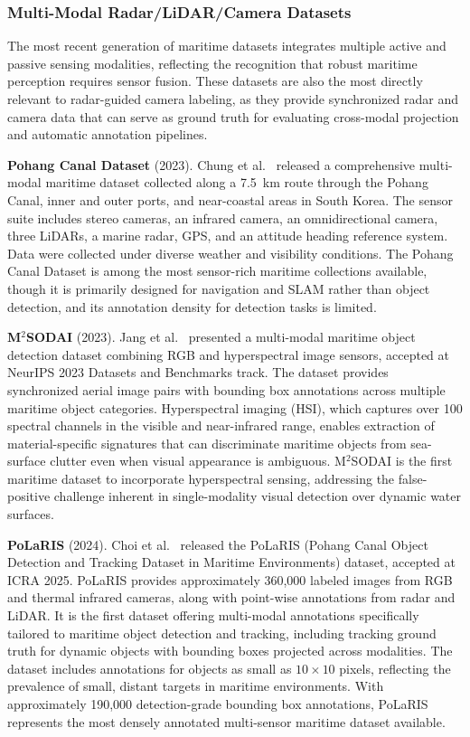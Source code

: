 \subsubsection{Multi-Modal Radar/LiDAR/Camera Datasets}
\label{subsubsec:multimodal}

The most recent generation of maritime datasets integrates multiple active and passive
sensing modalities, reflecting the recognition that robust maritime perception requires
sensor fusion. These datasets are also the most directly relevant to radar-guided camera
labeling, as they provide synchronized radar and camera data that can serve as ground
truth for evaluating cross-modal projection and automatic annotation pipelines.

\textbf{Pohang Canal Dataset} (2023). Chung et al.~\cite{Chung2023Pohang} released a
comprehensive multi-modal maritime dataset collected along a 7.5~km route through the
Pohang Canal, inner and outer ports, and near-coastal areas in South Korea. The sensor
suite includes stereo cameras, an infrared camera, an omnidirectional camera, three
LiDARs, a marine radar, GPS, and an attitude heading reference system. Data were collected
under diverse weather and visibility conditions. The Pohang Canal Dataset is among the
most sensor-rich maritime collections available, though it is primarily designed for
navigation and SLAM rather than object detection, and its annotation density for detection
tasks is limited.

\textbf{M$^2$SODAI} (2023). Jang et al.~\cite{Jang2023M2SODAI} presented a multi-modal
maritime object detection dataset combining RGB and hyperspectral image sensors, accepted
at NeurIPS 2023 Datasets and Benchmarks track. The dataset provides synchronized aerial
image pairs with bounding box annotations across multiple maritime object categories.
Hyperspectral imaging (HSI), which captures over 100 spectral channels in the visible
and near-infrared range, enables extraction of material-specific signatures that can
discriminate maritime objects from sea-surface clutter even when visual appearance is
ambiguous. M$^2$SODAI is the first maritime dataset to incorporate hyperspectral sensing,
addressing the false-positive challenge inherent in single-modality visual detection
over dynamic water surfaces.

\textbf{PoLaRIS} (2024). Choi et al.~\cite{Choi2024PoLaRIS} released the PoLaRIS
(Pohang Canal Object Detection and Tracking Dataset in Maritime Environments) dataset,
accepted at ICRA 2025. PoLaRIS provides approximately 360,000 labeled images from RGB
and thermal infrared cameras, along with point-wise annotations from radar and LiDAR. It
is the first dataset offering multi-modal annotations specifically tailored to maritime
object detection and tracking, including tracking ground truth for dynamic objects with
bounding boxes projected across modalities. The dataset includes annotations for objects
as small as $10 \times 10$ pixels, reflecting the prevalence of small, distant targets
in maritime environments. With approximately 190,000 detection-grade bounding box
annotations, PoLaRIS represents the most densely annotated multi-sensor maritime
dataset available.

